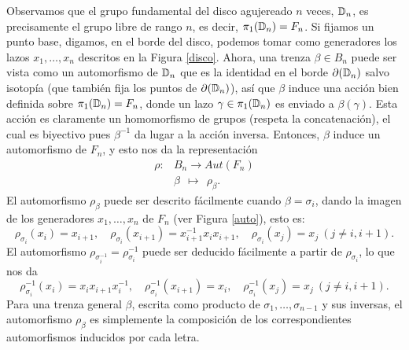 \documentclass[TFG.tex]{subfiles}
\begin{document}
Observamos que el grupo fundamental del disco agujereado $n$ veces, $\mathbb{D}_n$, es precisamente el grupo libre de rango $n$, es decir, $\pi_1(\mathbb{D}_n)=F_n$. Si fijamos un punto base, digamos, en el borde del disco, podemos tomar como generadores los lazos $x_1,\dots, x_n$ descritos en la Figura \ref{disco}. Ahora, una trenza $\beta\in B_n$ puede ser vista como un automorfismo de $\mathbb{D}_n$ que es la identidad en el borde $\partial(\mathbb{D}_n)$ salvo isotopía (que también fija los puntos de $\partial(\mathbb{D}_n)$), así que $\beta$ induce una acción bien definida sobre $\pi_1(\mathbb{D}_n)=F_n$, donde un lazo $\gamma\in\pi_1(\mathbb{D}_n)$ es enviado a $\beta(\gamma)$. Esta acción es claramente un homomorfismo de grupos (respeta la concatenación), %
el cual es biyectivo pues $\beta^{-1}$ da lugar a la acción inversa. Entonces, $\beta$ induce un automorfismo de $F_n$, y esto nos da la representación
\begin{align*}
\rho: & B_n \to Aut(F_n)\\
      & \beta\ \ \mapsto\ \ \rho_\beta.
\end{align*}
El automorfismo $\rho_\beta$ puede ser descrito fácilmente cuando $\beta=\sigma_i$, dando la imagen de los generadores $x_1,\dots, x_n$ de $F_n$ (ver Figura \ref{auto}), esto es:
$$\rho_{\sigma_i}(x_i)=x_{i+1},\quad \rho_{\sigma_i}(x_{i+1})=x_{i+1}^{-1}x_ix_{i+1},\quad \rho_{\sigma_i}(x_j)=x_j\ (j\neq i,i+1).$$
El automorfismo $\rho_{\sigma_i^{-1}}=\rho^{-1}_{\sigma_i}$ puede ser deducido fácilmente a partir de $\rho_{\sigma_i}$, lo que nos da
$$\rho^{-1}_{\sigma_i}(x_i)=x_ix_{i+1}x_i^{-1},\quad \rho^{-1}_{\sigma_i}(x_{i+1})=x_i,\quad \rho^{-1}_{\sigma_i}(x_j)=x_j\ (j\neq i,i+1).$$
Para una trenza general $\beta$, escrita como producto de $\sigma_1,\dots,\sigma_{n-1}$ y sus inversas, el automorfismo $\rho_\beta$ es simplemente la composición de los correspondientes automorfismos inducidos por cada letra.
\end{document}
